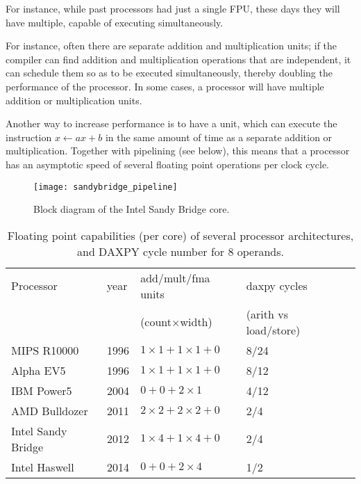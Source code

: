 For instance, while past processors had just a single \acf{FPU},
these days they will have multiple, capable of executing
simultaneously.

For instance, often there are separate addition and
multiplication units; if the compiler can find addition and
multiplication operations that are independent, it can schedule them
so as to be executed simultaneously, thereby doubling the performance
of the processor. In some cases, a processor will have multiple
addition or multiplication units.

Another way to increase performance is to have a 
unit, which can execute the instruction $x\leftarrow ax+b$ in the same
amount of time as a separate addition or multiplication. Together with
pipelining (see below), this means that a processor has an asymptotic
speed of several floating point operations per clock cycle.

\begin{figure}[ht]
  \texttt{[image: sandybridge\_pipeline]}
  \caption{Block diagram of the Intel Sandy Bridge core.}
  \label{fig:sandycore}
\end{figure}

\begin{table}[ht]
  \centering
  \begin{tabular}{p{2in}llll}
    \toprule
Processor&year&add/mult/fma units  &daxpy cycles\\
         &    &(count$\times$width)&(arith vs load/store)\\
\midrule
MIPS R10000       &1996 &$1\times1+1\times1+0$ &8/24 \\
Alpha EV5         &1996 &$1\times1+1\times1+0$ &8/12 \\
IBM Power5        &2004 &$0+0+2\times1       $ &4/12 \\
AMD Bulldozer     &2011 &$2\times2+2\times2+0$ &2/4  \\
Intel Sandy Bridge&2012 &$1\times4+1\times4+0$ &2/4  \\
Intel Haswell     &2014 &$0+0+2\times 4      $ &1/2  \\
\bottomrule
  \end{tabular}
  \caption{Floating point capabilities (per core) of several processor architectures,
  and DAXPY cycle number for 8 operands.}
  \label{tab:chipfloats}
\end{table}

